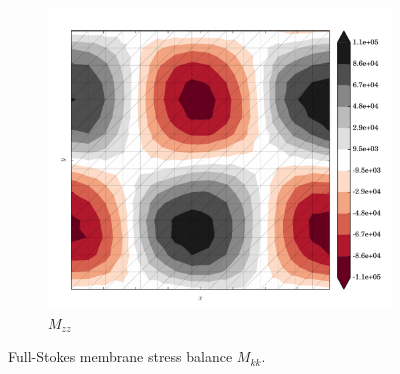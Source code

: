 \begin{figure}
  \begin{subfigure}[b]{0.3\linewidth}
    \includegraphics[width=\linewidth]{images/stress_balance/FS/M_zz.pdf}
  \caption{$M_{zz}$}
  \label{fs_M_zz}
  \end{subfigure}
 
  \caption[ISMIP-HOM full-Stokes membrane stress balance]{Full-Stokes membrane stress balance $M_{kk}$.}

  \label{fs_membrane_stress_balance}

\end{figure}


